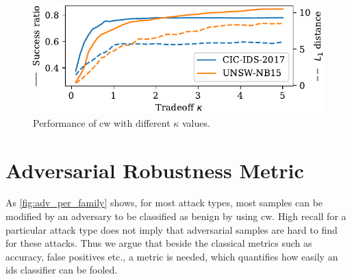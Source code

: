 \documentclass[conference]{IEEEtran}
\begin{document}

\begin{figure}[t]
\includegraphics[width=\columnwidth]{../plots/adv_comparison/tradeoff.pdf}
\caption{Performance of \gls{cw} with different $\kappa$ values.}
\label{fig:adv_cw}
\end{figure}

\section{Adversarial Robustness Metric}

As \autoref{fig:adv_per_family} shows, for most attack types, most samples can be modified by an adversary to be classified as benign by using \gls{cw}. High recall for a particular attack type does not imply that adversarial samples are hard to find  %
for these attacks. Thus we argue that beside the classical metrics such as accuracy, false positives etc., a metric is needed, which quantifies how easily an \gls{ids} classifier can be fooled.
\end{document}
